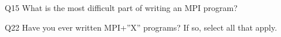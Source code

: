 \begin{description}%
\item{Q15} What is the most difficult part of writing an MPI program?%
\item{Q22} Have you ever written MPI+”X” programs? If so, select all that apply.%
\end{description}%
